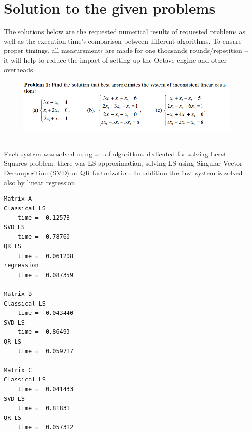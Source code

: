 \documentclass[eng,openany]{mgr}
\author{Jaroslaw M. Szumega}
\title{}
\date{06.04.2017}
\begin{document}
\maketitle
\tableofcontents
\chapter{Solution to the given problems}
The solutions below are the requested numerical results of requested problems as well as the execution time's comparison between different algorithms. To ensure proper timings, all measurements are made for one thousands rounds/repetition -- it will help to reduce the impact of setting up the Octave engine and other overheads.
\begin{figure}[h]
	\centering
	\includegraphics[width=0.6\linewidth]{screenshot001}
	\label{fig:screenshot001}
\end{figure}
\\Each system was solved using set of algorithms dedicated for solving Least Squares problem: there was LS approximation, solving LS using Singular Vector Decomposition (SVD) or QR factorization. In addition the first system is solved also by linear regression.
\begin{lstlisting}
Matrix A
Classical LS
	time =  0.12578
SVD LS
	time =  0.78760
QR LS
	time =  0.061208
regression
	time =  0.087359

Matrix B
Classical LS
	time =  0.043440
SVD LS
	time =  0.86493
QR LS
	time =  0.059717

Matrix C
Classical LS
	time =  0.041433
SVD LS
	time =  0.81831
QR LS
	time =  0.057312
\end{lstlisting}
\end{document}
